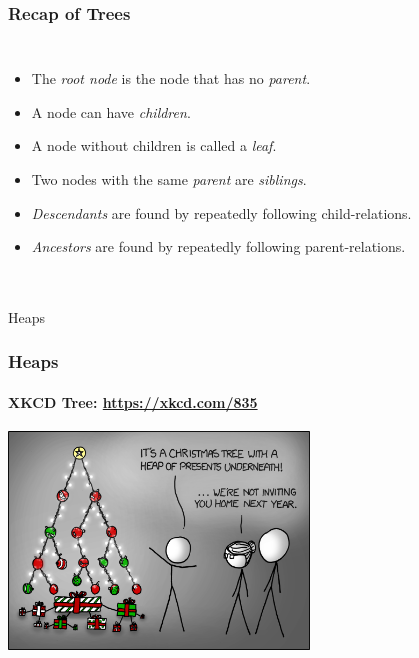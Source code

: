 \begin{frame}
	\frametitle{Recap of Trees}
	\begin{columns}
		\begin{itemize}
			\item The \textit{root node} is the node that has no \textit{parent}.
			\item A node can have \textit{children}.
			\item A node without children is called a \textit{leaf}.
			\item Two nodes with the same \textit{parent} are \textit{siblings}.
			\item \textit{Descendants} are found by repeatedly following child-relations.
			\item \textit{Ancestors} are found by repeatedly following parent-relations.
		\end{itemize}
	\end{columns}
\end{frame}

\begin{frame}[fragile]\frametitle{}
\begin{center}
{\Large Heaps}
\end{center}

\end{frame}


\begin{frame}
	\frametitle{Heaps}
	\framesubtitle{XKCD Tree: \url{https://xkcd.com/835}}
	\begin{center}
		\includegraphics[width=0.6\textwidth]{images/tree.png}\\
	\end{center}
\end{frame}

